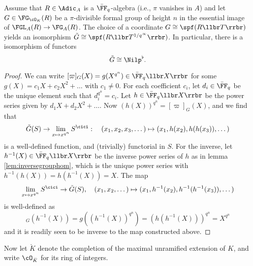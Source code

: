 \documentclass[../main.tex]{subfiles}
\begin{document}
\begin{prop}\label{prop:UnivCovRepFq}
    Assume that $R \in \Adic_{A}$ is a $\bar \FF_q$-algebra (i.e., $\pi$
    vanishes in $A$) and let $G \in \FG_{\cO_K}(R)$ be a $\pi$-divisible
    formal group of height $n$ in the essential image of 
    $\FGL_A(R) \to \FG_A(R)$. The choice of a coordinate $G \cong \spf(R\llbr
    T \rrbr)$ yields an isomorphism $\tilde G \cong \spf(R\llbr
    T^{1/q^\infty}\rrbr)$. In particular, there is a isomorphism of functors
    \begin{equation*}
        \tilde G \cong \Nilp^\flat.
    \end{equation*}
\begin{proof}
    We can write $[\varpi]_G(X) = g(X^{q^n}) \in \bar \FF_q\llbr X \rrbr$ for some 
    $g(X) = c_1X + c_2X^2 + \dots$ with $c_1 \neq 0$. For each coefficient $c_i$, let
    $d_i \in \bar \FF_q$ be the unique element such that $d_i^{q^n} = c_i$. Let
    $h \in \bar \FF_q\llbr X \rrbr$ be the power series given by $d_1 X + d_2
    X^2 + \dots$. Now $(h(X))^{q^n}=[\varpi]_G(X)$, and we find that 
    \begin{equation*}
        \tilde G(S) \to \lim_{x \mapsto x^{q^n}} S^\cici: \quad
        (x_1, x_2, x_3, \dots) \mapsto (x_1, h(x_2), h(h(x_3)), \dots)
    \end{equation*}
    is a well-defined function, and (trivially) functorial in $S$. For the
    inverse, let $h^{-1}(X) \in \bar \FF_q\llbr X \rrbr$ be the inverse power
    series of $h$ as in lemma \ref{lem:inversegrouphom}, which is the unique power
    series with $h^{-1}(h(X))= h(h^{-1}(X)) = X$. The map
    \begin{equation*}
        \lim_{x \mapsto x^{q^n}} S^\cici \to \tilde G(S), \quad 
        (x_1, x_2, \dots ) \mapsto (x_1, h^{-1}(x_2), h^{-1}(h^{-1}(x_3)), \dots)
    \end{equation*}
    is well-defined as
    \begin{equation*}
        [\varpi]_G(h^{-1}(X)) = g((h^{-1}(X))^{q^n}) = (h(h^{-1}(X)))^{q^n} =
        X^{q^n}
    \end{equation*}
    and it is readily seen to be inverse to the map constructed above.
\end{proof}
\end{prop}

Now let $\breve K$ denote the completion of the maximal unramified extension of 
$K$, and write $\cO_{\breve K}$ for its ring of integers. 
\end{document}
